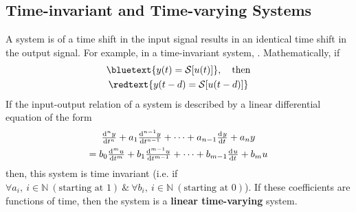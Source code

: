 \documentclass[../notes-main.tex]{subfiles}
\begin{document}
\subsection{Time-invariant and Time-varying Systems}
\begin{mdframed}
    \begin{center}
         A system is  of a time shift in the input signal results in an identical time shift in the output signal. For example, in a time-invariant system, . Mathematically, if
        \begin{gather}
            \bluetext{y(t) = \mathcal{S}[u(t)]}, \quad \text{then}\\ \redtext{y(t - d) = \mathcal{S}[u(t - d)]}
            \label{eq:time-invariant-system-equation}
        \end{gather}
         If the input-output relation of a system is described by a linear differential equation of the form
        \begin{gather}
            \od[n]{y}{t} + a_1\od[n-1]{y}{t} + \dots + a_{n-1} \od{y}{t} + a_ny\\ 
            = b_0\od[m]{u}{t} + b_1\od[m-1]{u}{t} + \dots + b_{m-1}\od{u}{t} + b_mu
            \label{eq:time-invariant-ode}
        \end{gather}
        then, this system is time invariant  (i.e. if \(\forall a_i, \ i \in \mathbb{N}\ (\text{starting at 1})\ \& \ \forall b_i, \ i \in \mathbb{N}\ (\text{starting at 0})\)). If these coefficients are functions of time, then the system is a \textbf{linear time-varying} system.
    \end{center}
\end{mdframed}\label{fig:time-invariant-variant-def-mf}
\end{document}
